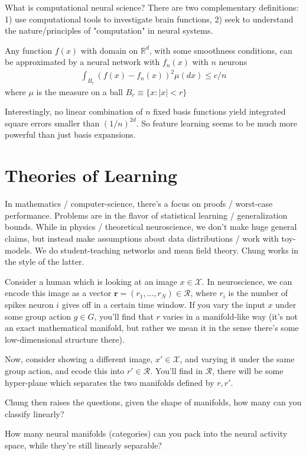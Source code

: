 What is computational neural science? There are two complementary definitions: 1) use computational tools to investigate brain functions, 2) seek to understand the nature/principles of "computation" in neural systems.

\begin{definition}
	 Any function $f(x)$ with domain on $\mathbb R^d$, with some smoothness conditions, can be approximated by a neural network with $f_n(x)$ with $n$ neurons
	\begin{align}
		\int_{B_r} (f(x) - f_n(x))^2 \mu(dx) \leq c/ n
	\end{align}
	where $\mu$ is the measure on a ball $B_r \equiv \{x: |x| < r\}$
\end{definition}
Interestingly, no linear combination of $n$ fixed basis functions yield integrated square errors smaller than $(1/n)^{2d}$. So feature learning seems to be much more powerful than just basis expansions.

\section{Theories of Learning}
In mathematics / computer-science, there's a focus on proofs / worst-case performance. Problems are in the flavor of statistical learning / generalization bounds. While in physics / theoretical neuroscience, we don't make huge general claims, but instead make assumptions about data distributions / work with toy-models. We do student-teaching networks and mean field theory. Chung works in the style of the latter.

Consider a human which is looking at an image $x \in \mathcal X$. In neuroscience, we can encode this image as a vector $\mathbf r = (r_1, ..., r_N) \in \mathcal R$, where $r_i$ is the number of spikes neuron $i$ gives off in a certain time window. If you vary the  input $x$ under some group action $g \in G$, you'll find that $r$ varies in a manifold-like way (it's not an exact mathematical manifold, but rather we mean it in the sense there's some low-dimensional structure there).

Now, consider showing a different image, $x' \in \mathcal X$, and varying it under the same group action, and ecode this into $r' \in \mathcal R$. You'll find in $\mathcal R$, there will be some hyper-plane which separates the two manifolds defined by $r, r'$.

Chung then raises the questions, given the shape of manifolds, how many can you classify linearly? 
\begin{definition}
	 How many neural manifolds (categories) can you pack into the neural activity space, while they're still linearly separable?
\end{definition}
